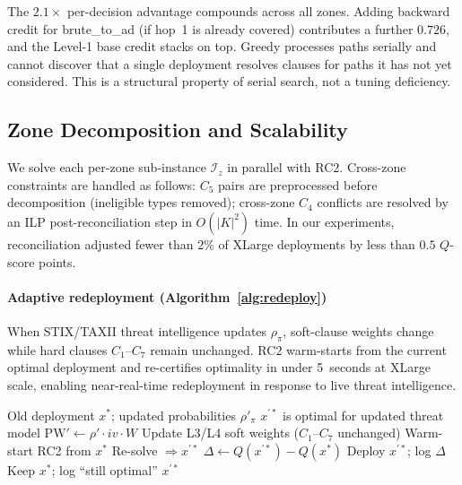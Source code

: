 \documentclass[journal]{IEEEtran}
\newcommand{\qscore}{$Q$-score}
\begin{document}
The $2.1\times$ per-decision advantage compounds across all zones.
Adding backward credit for brute\_to\_ad (if hop~1 is already
covered) contributes a further $0.726$, and the Level-1 base credit
stacks on top. Greedy processes paths serially and cannot discover
that a single deployment resolves clauses for paths it has not yet
considered. This is a structural property of serial search, not a
tuning deficiency.

\subsection{Zone Decomposition and Scalability}
\label{sec:solver}

We solve each per-zone sub-instance $\mathcal{I}_z$ in parallel with
RC2. Cross-zone constraints are handled as follows: $C_5$ pairs are
preprocessed before decomposition (ineligible types removed); cross-zone
$C_4$ conflicts are resolved by an ILP post-reconciliation step in
$O(|K|^2)$ time. In our experiments, reconciliation adjusted fewer
than $2\%$ of XLarge deployments by less than $0.5$ \qscore{} points.

\paragraph{Adaptive redeployment (Algorithm~\ref{alg:redeploy})}
When STIX/TAXII threat intelligence updates $\rho_\pi$, soft-clause
weights change while hard clauses $C_1$--$C_7$ remain unchanged. RC2
warm-starts from the current optimal deployment and re-certifies
optimality in under 5~seconds at XLarge scale, enabling near-real-time
redeployment in response to live threat intelligence.

\begin{algorithm}
\caption{Adaptive Redeployment on Updated Threat Priors}
\label{alg:redeploy}
\begin{algorithmic}[1]
\REQUIRE Old deployment $x^*$; updated probabilities $\rho'_\pi$
\ENSURE $x^{\prime*}$ is optimal for updated threat model
\STATE $\mathrm{PW}'\leftarrow\rho'\cdot iv\cdot W$
\STATE Update L3/L4 soft weights ($C_1$--$C_7$ unchanged)
\STATE Warm-start RC2 from $x^*$
\STATE Re-solve $\Rightarrow x^{\prime*}$
\STATE $\Delta\leftarrow Q(x^{\prime*})-Q(x^*)$
  \STATE Deploy $x^{\prime*}$; log $\Delta$
\ELSE
  \STATE Keep $x^*$; log ``still optimal''
\ENDIF
\RETURN $x^{\prime*}$
\end{algorithmic}
\end{algorithm}
\end{document}
